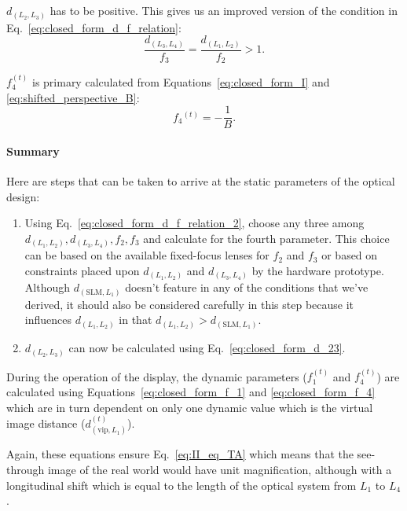 $d_{(L_2,L_3)}$ has to be positive. This gives us an improved version of the condition in Eq.~\eqref{eq:closed_form_d_f_relation}:
\begin{equation}
    \frac{d_{(L_3,L_4)}}{f_3} = \frac{d_{(L_1,L_2)}}{f_2} > 1.
    \label{eq:closed_form_d_f_relation_2}
\end{equation}

$f_4^{(t)}$ is primary calculated from Equations~\eqref{eq:closed_form_I} and \eqref{eq:shifted_perspective_B}:
\begin{equation}
    f_4{^{(t)}} = -\frac{1}{B}.
    \label{eq:closed_form_f_4}
\end{equation}

\paragraph{\textbf{Summary}}
Here are steps that can be taken to arrive at the static parameters of the optical design:
\begin{enumerate}
    \item Using Eq.~\eqref{eq:closed_form_d_f_relation_2}, choose any three among $d_{(L_1,L_2)}, d_{(L_3,L_4)}, f_2, f_3$ and calculate for the fourth parameter. This choice can be based on the available fixed-focus lenses for $f_2$ and $f_3$ or based on constraints placed upon $d_{(L_1,L_2)}$ and $d_{(L_3,L_4)}$ by the hardware prototype. Although $d_{(\text{SLM},L_1)}$ doesn't feature in any of the conditions that we've derived, it should also be considered carefully in this step because it influences $d_{(L_1,L_2)}$ in that $d_{(L_1,L_2)} > d_{(\text{SLM},L_1)}$. 
    \item $d_{(L_2,L_3)}$ can now be calculated using Eq.~\eqref{eq:closed_form_d_23}.
\end{enumerate}


During the operation of the display, the dynamic parameters ($f_1^{(t)}$ and $f_4^{(t)}$) are calculated using Equations~\eqref{eq:closed_form_f_1} and \eqref{eq:closed_form_f_4} which are in turn dependent on only one dynamic value which is the virtual image distance ($d_{(\text{vip},L_1)}^{(t)}$). 

Again, these equations ensure Eq.~\eqref{eq:II_eq_TA} which means that the see-through image of the real world would have unit magnification, although with a longitudinal shift which is equal to the length of the optical system from $L_1$ to $L_4$.

